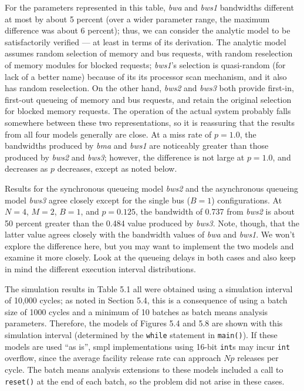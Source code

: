 For the parameters represented in this table, \emph{bwa} and \emph{bws1} bandwidths
different at most by about 5 percent (over a wider parameter range, the
maximum difference was about 6 percent); thus, we can consider the analytic
model to be satisfactorily verified --- at least in terms of its derivation. The
analytic model assumes random selection of memory and bus requests, with
random reselection of memory modules for blocked requests; \emph{bws1}'s selection
is quasi-random (for lack of a better name) because of its its processor scan
mechanism, and it also has random reselection. On the other hand, \emph{bws2} and
\emph{bws3} both provide first-in, first-out queueing of memory and bus requests, and
retain the original selection for blocked memory requests. The operation of
the actual system probably falls somewhere between these two representations,
so it is reassuring that the results from all four models generally are
close. At a miss rate of $p=1.0$, the bandwidths produced by \emph{bma} and \emph{bws1}
are noticeably greater than those produced by \emph{bws2} and \emph{bws3}; however, the
difference is not large at $p=1.0$, and decreases as $p$ decreases, except as noted
below.

Results for the synchronous queueing model \emph{bws2} and the asynchronous
queueing model \emph{bws3} agree closely except for the single bus ($B=1$) configurations.
At $N=4$, $M=2$, $B=1$, and $p=0.125$, the bandwidth of 0.737 from \emph{bws2} is
about 50 percent greater than the 0.484 value produced by \emph{bws3}. Note,
though, that the latter value agrees closely with the bandwidth values of
\emph{bwa} and \emph{bws1}. We won't explore the difference here, but you may want to
implement the two models and examine it more closely. Look at the queueing
delays in both cases and also keep in mind the different execution interval
distributions.

The simulation results in Table 5.1 all were obtained using a simulation
interval of 10,000 cycles; as noted in Section 5.4, this is a consequence of using
a batch size of 1000 cycles and a minimum of 10 batches as batch means
analysis parameters. Therefore, the models of Figures 5.4 and 5.8 are shown
with this simulation interval (determined by the \texttt{while} statement in
\texttt{main()}). If these models are used ``as is'', smpl implementations using 16-bit
\texttt{int}s may incur \texttt{int} overflow, since the average facility release rate can
approach $Np$ releases per cycle. The batch means analysis extensions to
these models included a call to \texttt{reset()} at the end of each batch, so the
problem did not arise in these cases.

